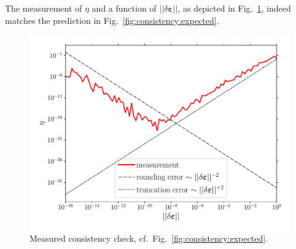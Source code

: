\documentclass[garamond]{goose-article}
\begin{document}
The measurement of $\eta$ and a function of $|| \delta \bm{\varepsilon} ||$, as depicted in Fig.~\ref{fig:consistency}, indeed matches the prediction in Fig.~\ref{fig:consistency:expected}.

\begin{figure}[htp]
  \centering
  \includegraphics[width=.5\textwidth]{examples/consistency}
  \caption{Measured consistency check, cf.\ Fig.~\ref{fig:consistency:expected}.}
  \label{fig:consistency}
\end{figure}


\end{document}
